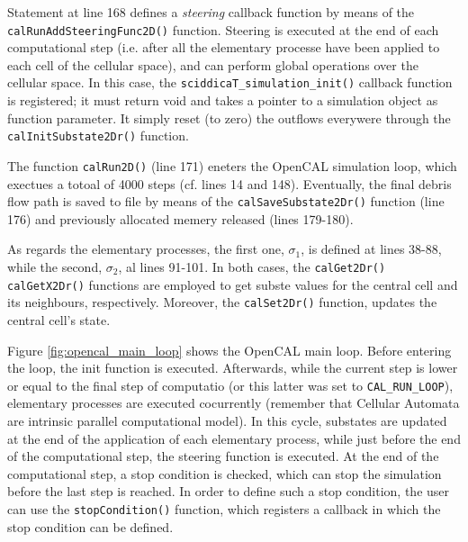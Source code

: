 Statement at line 168 defines a \emph{steering} callback function by
means of the \verb'calRunAddSteeringFunc2D()' function. Steering is
executed at the end of each computational step (i.e. after all the
elementary processe have been applied to each cell of the cellular
space), and can perform global operations over the cellular space. In
this case, the \verb'sciddicaT_simulation_init()' callback function is
registered; it must return void and takes a pointer to a simulation
object as function parameter. It simply reset (to zero) the outflows
everywere through the \verb'calInitSubstate2Dr()' function.

The function \verb'calRun2D()' (line 171) eneters the OpenCAL
simulation loop, which exectues a totoal of 4000 steps (cf. lines 14
and 148). Eventually, the final debris flow path is saved to file by
means of the \verb'calSaveSubstate2Dr()' function (line 176) and
previously allocated memery released (lines 179-180).

As regards the elementary processes, the first one, $\sigma_1$, is
defined at lines 38-88, while the second, $\sigma_2$, al lines
91-101. In both cases, the \verb'calGet2Dr()' \verb'calGetX2Dr()'
functions are employed to get subste values for the central cell and
its neighbours, respectively. Moreover, the \verb'calSet2Dr()'
function, updates the central cell's state.

Figure \ref{fig:opencal_main_loop} shows the OpenCAL main loop. Before
entering the loop, the init function is executed. Afterwards, while
the current step is lower or equal to the final step of computatio (or
this latter was set to \verb'CAL_RUN_LOOP'), elementary processes are
executed cocurrently (remember that Cellular Automata are intrinsic
parallel computational model). In this cycle, substates are updated at
the end of the application of each elementary process, while just
before the end of the computational step, the steering function is
executed. At the end of the computational step, a stop condition is
checked, which can stop the simulation before the last step is
reached. In order to define such a stop condition, the user can use
the \verb'stopCondition()' function, which registers a callback in
which the stop condition can be defined.

